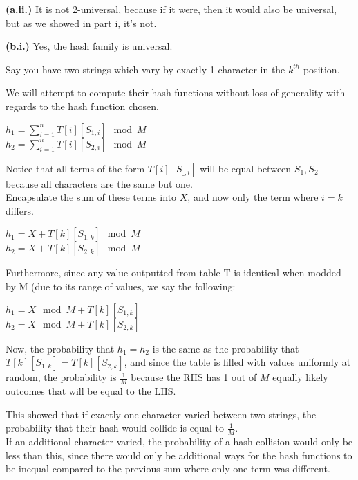 \documentclass[11pt]{article}
\renewcommand{\part}[1] {\vspace{.10in} {\bf (#1)}}
\begin{document}
\part{a.ii.}
It is not 2-universal, because if it were, then it would also be universal, but as we showed in part i, it's not. 

\part{b.i.}
Yes, the hash family is universal.

Say you have two strings which vary by exactly 1 character in the $k^{th}$ position.

We will attempt to compute their hash functions without loss of generality with regards to the hash function chosen.

$h_1 = \sum_{i=1}^{n} T[i][S_{1,i}] \mod M$\\
$h_2 = \sum_{i=1}^{n} T[i][S_{2,i}] \mod M$

Notice that all terms of the form $T[i][S_{\_,i}]$ will be equal between $S_1, S_2$ because all characters are the same but one.\\
Encapsulate the sum of these terms into $X$, and now only the term where $i=k$ differs.

$h_1 = X + T[k][S_{1,k}] \mod M$\\
$h_2 = X + T[k][S_{2,k}] \mod M$

Furthermore, since any value outputted from table T is identical when modded by M (due to its range of values, we say the following:

$h_1 = X \mod M + T[k][S_{1,k}] $\\
$h_2 = X \mod M + T[k][S_{2,k}] $

Now, the probability that $h_1 = h_2$ is the same as the probability that $T[k][S_{1,k}] = T[k][S_{2,k}]$, and since the table
is filled with values uniformly at random, the probability is $\frac{1}{M}$ because the RHS has 1 out of $M$ equally likely outcomes
that will be equal to the LHS.

This showed that if exactly one character varied between two strings, the probability that their hash would collide is equal to $\frac{1}{M}$.\\
If an additional character varied, the probability of a hash collision would only be less than this, since there would only be additional ways for the hash functions to be inequal compared to the previous sum where only one term was different.
\end{document}
